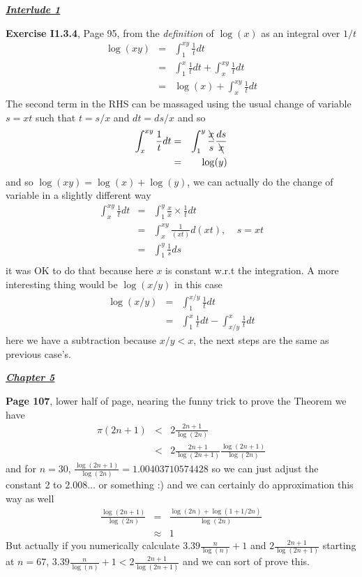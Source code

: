 \documentclass[aps,preprint,preprintnumbers,nofootinbib,showpacs,prd]{revtex4-1}
\newcommand{\nbea}{\begin{eqnarray*}}
\newcommand{\neea}{\end{eqnarray*}}
\begin{document}
\bigskip
\underline{\textbf{\textit{Interlude 1}}}
\bigskip

{\bf Exercise I1.3.4}, Page 95, from the {\it definition} of $\log(x)$ as an integral over $1/t$
%
\nbea
\log(xy) & = & \int_1^{xy} \frac{1}{t} dt \\
& = & \int_1^x \frac{1}{t} dt + \int_x^{xy} \frac{1}{t} dt \\
& = & \log(x) + \int_x^{xy} \frac{1}{t} dt
\neea
%
The second term in the RHS can be massaged using the usual change of variable $s = xt$ such that $t = s/x$ and $dt = ds/x$ and so
%
\nbea
\int_x^{xy} \frac{1}{t} dt & = & \int_1^{y} \frac{\bcancel{x}}{s} \frac{ds}{\bcancel{x}} \\
& = & \log(y)
\neea
%
and so $\log(xy) = \log(x) + \log(y)$, we can actually do the change of variable in a slightly different way
%
\nbea
\int_x^{xy} \frac{1}{t} dt & = & \int_1^{y} \frac{x}{x}\times\frac{1}{t} dt \\
& = & \int_x^{xy} \frac{1}{(xt)} d(xt), ~~~~~ s=xt \\
& = & \int_1^{y} \frac{1}{s} ds \\
\neea
%
it was OK to do that because here $x$ is constant w.r.t the integration. A more interesting thing would be $\log(x/y)$ in this case
%
\nbea
\log(x/y) & = & \int_1^{x/y} \frac{1}{t} dt \\
& = & \int_1^{x} \frac{1}{t} dt - \int_{x/y}^{x} \frac{1}{t} dt
\neea
%
here we have a subtraction because $x/y < x$, the next steps are the same as previous case's.

\bigskip
\underline{\textbf{\textit{Chapter 5}}}
\bigskip

{\bf Page 107}, lower half of page, nearing the funny trick to prove the Theorem we have
%
\nbea
\pi(2n+1) & < & 2\frac{2n+1}{\log(2n)} \\
& < & 2\frac{2n+1}{\log(2n+1)}\frac{\log(2n+1)}{\log(2n)}
\neea
%
and for $n=30$, $\frac{\log(2n+1)}{\log(2n)} = 1.00403710574428$ so we can just adjust the constant 2 to $2.008\ldots$ or something :) and we can certainly do approximation this way as well
%
\nbea
\frac{\log(2n+1)}{\log(2n)} & = & \frac{\log(2n)+\log(1+1/2n)}{\log(2n)} \\
& \approx & 1
\neea
%
But actually if you numerically calculate $3.39 \frac{n}{\log(n)}+1$ and $2\frac{2n+1}{\log(2n+1)}$ starting at $n=67$, $3.39 \frac{n}{\log(n)}+1 < 2\frac{2n+1}{\log(2n+1)}$ and we can sort of prove this. 
\end{document}
